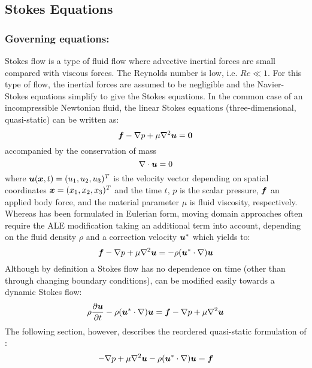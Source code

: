 \subsection{Stokes Equations}

\subsubsection{Governing equations:}

Stokes flow is a type of fluid flow where advective inertial forces are small compared with viscous forces. The Reynolds number is low, i.e. $\textit{Re}\ll 1$. For this type of flow, the inertial forces are assumed to be negligible and the Navier-Stokes equations simplify to give the Stokes equations. In the common case of an incompressible Newtonian fluid, the linear Stokes equations (three-dimensional, quasi-static) can be written as:
\begin{equation}
    \vectr{f}-\gradient{}{p}+\mu\laplacian{\vectr{u}}=\vectr{0}
  \label{eqn:Stokesequation1}
\end{equation}
accompanied by the conservation of mass
\begin{equation}
  \divergence{}{\vectr{u}}=0
  \label{eqn:Stokesmasequation}
\end{equation}
where $\boldsymbol{u}(\boldsymbol{x},t)=(u_1,u_2,u_3)^T$ is the velocity vector depending on spatial coordinates $\boldsymbol{x}=(x_1,x_2,x_3)^T$ and the time $t$, $p$ is the scalar pressure, $\boldsymbol{f}$ an applied body force, and the material parameter $\mu$ is fluid viscosity, respectively. Whereas  has been formulated in Eulerian form, moving domain approaches often require the ALE modification taking an additional term into account, depending on the fluid density $\rho$ and a correction velocity $\boldsymbol{u}^*$ which yields to:
\begin{equation}
    \vectr{f}-\gradient{}{p}+\mu\laplacian{\vectr{u}}=-\rho(\vectr{u}^*\cdot\grad)\vectr{u}
  \label{eqn:StokesequationALE}
\end{equation}
Although by definition a Stokes flow has no dependence on time (other than through changing boundary conditions),  can be modified easily towards a dynamic Stokes flow:
\begin{equation}
    \rho\delby{\vectr{u}}{t}-\rho(\vectr{u}^*\cdot\grad)\vectr{u}=\vectr{f}-\gradient{}{p}+\mu\laplacian{\vectr{u}}
  \label{eqn:Stokesequation2}
\end{equation}
The following section, however, describes the reordered quasi-static formulation of  :
\begin{equation}
    -\gradient{}{p}+\mu\laplacian{\vectr{u}}-\rho(\vectr{u}^*\cdot\grad)\vectr{u}=\vectr{f}
  \label{eqn:StokesequationALE2}
\end{equation}


